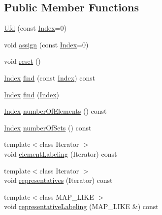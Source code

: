 \subsection*{Public Member Functions}
\begin{DoxyCompactItemize}
\item 
\hyperlink{classnifty_1_1ufd_1_1Ufd_aab82fff1e159408a465bee8547f67358}{Ufd} (const \hyperlink{classnifty_1_1ufd_1_1Ufd_a0a9a7ab02b6d77fb2035234cbda8b3a7}{Index}=0)
\item 
void \hyperlink{classnifty_1_1ufd_1_1Ufd_a9a6de315835c32c6c9ef80603e36cb41}{assign} (const \hyperlink{classnifty_1_1ufd_1_1Ufd_a0a9a7ab02b6d77fb2035234cbda8b3a7}{Index}=0)
\item 
void \hyperlink{classnifty_1_1ufd_1_1Ufd_ab88f28136d563c4605960bf9aef2d86f}{reset} ()
\item 
\hyperlink{classnifty_1_1ufd_1_1Ufd_a0a9a7ab02b6d77fb2035234cbda8b3a7}{Index} \hyperlink{classnifty_1_1ufd_1_1Ufd_aa68dd37173ce831b7720ccbb52c2c0a8}{find} (const \hyperlink{classnifty_1_1ufd_1_1Ufd_a0a9a7ab02b6d77fb2035234cbda8b3a7}{Index}) const
\item 
\hyperlink{classnifty_1_1ufd_1_1Ufd_a0a9a7ab02b6d77fb2035234cbda8b3a7}{Index} \hyperlink{classnifty_1_1ufd_1_1Ufd_ad8527c71f15c6ecda301cd96fa391f35}{find} (\hyperlink{classnifty_1_1ufd_1_1Ufd_a0a9a7ab02b6d77fb2035234cbda8b3a7}{Index})
\item 
\hyperlink{classnifty_1_1ufd_1_1Ufd_a0a9a7ab02b6d77fb2035234cbda8b3a7}{Index} \hyperlink{classnifty_1_1ufd_1_1Ufd_a12fb9fc1558fe27c2f1dd8e55b3ac626}{number\+Of\+Elements} () const
\item 
\hyperlink{classnifty_1_1ufd_1_1Ufd_a0a9a7ab02b6d77fb2035234cbda8b3a7}{Index} \hyperlink{classnifty_1_1ufd_1_1Ufd_af2f635e155734ede82204da4080b8e5e}{number\+Of\+Sets} () const
\item 
{\footnotesize template$<$class Iterator $>$ }\\void \hyperlink{classnifty_1_1ufd_1_1Ufd_ad2010b31862f3d11756e0a5a510499f4}{element\+Labeling} (Iterator) const
\item 
{\footnotesize template$<$class Iterator $>$ }\\void \hyperlink{classnifty_1_1ufd_1_1Ufd_a026466a86a5c41b1c0366ea82c769d5a}{representatives} (Iterator) const
\item 
{\footnotesize template$<$class M\+A\+P\+\_\+\+L\+I\+KE $>$ }\\void \hyperlink{classnifty_1_1ufd_1_1Ufd_a13d68dde1039818ea71b21e72ada326a}{representative\+Labeling} (M\+A\+P\+\_\+\+L\+I\+KE \&) const

\end{DoxyCompactItemize}
